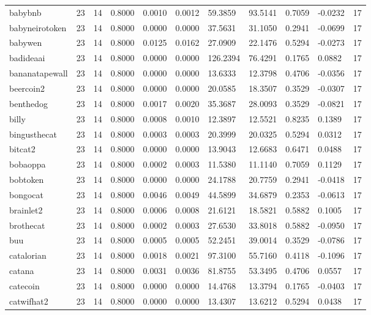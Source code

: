 \begin{table}[htbp]
\begin{tabular}{lllllllllll}
babybnb & 23 & 14 & 0.8000 & 0.0010 & 0.0012 & 59.3859 & 93.5141 & 0.7059 & -0.0232 & 17 \\
babyneirotoken & 23 & 14 & 0.8000 & 0.0000 & 0.0000 & 37.5631 & 31.1050 & 0.2941 & -0.0699 & 17 \\
babywen & 23 & 14 & 0.8000 & 0.0125 & 0.0162 & 27.0909 & 22.1476 & 0.5294 & -0.0273 & 17 \\
badideaai & 23 & 14 & 0.8000 & 0.0000 & 0.0000 & 126.2394 & 76.4291 & 0.1765 & 0.0882 & 17 \\
bananatapewall & 23 & 14 & 0.8000 & 0.0000 & 0.0000 & 13.6333 & 12.3798 & 0.4706 & -0.0356 & 17 \\
beercoin2 & 23 & 14 & 0.8000 & 0.0000 & 0.0000 & 20.0585 & 18.3507 & 0.3529 & -0.0307 & 17 \\
benthedog & 23 & 14 & 0.8000 & 0.0017 & 0.0020 & 35.3687 & 28.0093 & 0.3529 & -0.0821 & 17 \\
billy & 23 & 14 & 0.8000 & 0.0008 & 0.0010 & 12.3897 & 12.5521 & 0.8235 & 0.1389 & 17 \\
bingusthecat & 23 & 14 & 0.8000 & 0.0003 & 0.0003 & 20.3999 & 20.0325 & 0.5294 & 0.0312 & 17 \\
bitcat2 & 23 & 14 & 0.8000 & 0.0000 & 0.0000 & 13.9043 & 12.6683 & 0.6471 & 0.0488 & 17 \\
bobaoppa & 23 & 14 & 0.8000 & 0.0002 & 0.0003 & 11.5380 & 11.1140 & 0.7059 & 0.1129 & 17 \\
bobtoken & 23 & 14 & 0.8000 & 0.0000 & 0.0000 & 24.1788 & 20.7759 & 0.2941 & -0.0418 & 17 \\
bongocat & 23 & 14 & 0.8000 & 0.0046 & 0.0049 & 44.5899 & 34.6879 & 0.2353 & -0.0613 & 17 \\
brainlet2 & 23 & 14 & 0.8000 & 0.0006 & 0.0008 & 21.6121 & 18.5821 & 0.5882 & 0.1005 & 17 \\
brothecat & 23 & 14 & 0.8000 & 0.0002 & 0.0003 & 27.6530 & 33.8018 & 0.5882 & -0.0950 & 17 \\
buu & 23 & 14 & 0.8000 & 0.0005 & 0.0005 & 52.2451 & 39.0014 & 0.3529 & -0.0786 & 17 \\
catalorian & 23 & 14 & 0.8000 & 0.0018 & 0.0021 & 97.3100 & 55.7160 & 0.4118 & -0.1096 & 17 \\
catana & 23 & 14 & 0.8000 & 0.0031 & 0.0036 & 81.8755 & 53.3495 & 0.4706 & 0.0557 & 17 \\
catecoin & 23 & 14 & 0.8000 & 0.0000 & 0.0000 & 14.4768 & 13.3794 & 0.1765 & -0.0403 & 17 \\
catwifhat2 & 23 & 14 & 0.8000 & 0.0000 & 0.0000 & 13.4307 & 13.6212 & 0.5294 & 0.0438 & 17 \\

\end{tabular}
\end{table}
